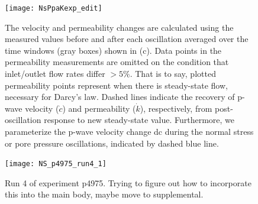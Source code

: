 \documentclass[letterpaper,10pt]{article}
\begin{document}

\begin{figure}[ht]
	\centering
	\texttt{[image: NsPpaKexp\_edit]}
	\caption[]{The velocity and permeability changes are calculated using the measured values before and after each oscillation averaged over the time windows (gray boxes) shown in (c). Data points in the permeability measurements are omitted on the condition that inlet/outlet flow rates differ $ > 5 \% $. That is to say, plotted permeability points represent when there is steady-state flow, necessary for Darcy’s law. Dashed lines indicate the recovery of p-wave velocity ($ \dot c$) and permeability ($\dot k$), respectively, from post-oscillation response to new steady-state value. Furthermore, we parameterize the p-wave velocity change dc during the normal stress or pore pressure oscillations, indicated by dashed blue line.}
	\label{fig:delc_delk_calc}
\end{figure}

\newpage

\begin{figure}[ht]
	\centering
	\texttt{[image: NS\_p4975\_run4\_1]}
	\caption{Run 4 of experiment p4975. Trying to figure out how to incorporate this into the main body, maybe move to supplemental.}
	\label{fig:run4_p4975}
\end{figure}

\newpage
\end{document}
